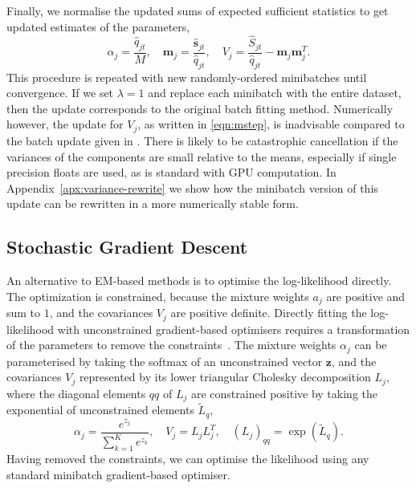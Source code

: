 \documentclass{article}
\newcommand{\bm}{\mathbf{m}}
\newcommand{\bs}{\mathbf{s}}
\begin{document}
Finally, we normalise the updated sums of expected sufficient statistics to get updated estimates of the parameters,
\begin{equation}
\alpha_{j} = \frac{\hat{q}_{jt}}{M}, \quad
\bm_{j} = \frac{\hat{\bs}_{jt}}{\hat{q}_{jt}}, \quad
V_{j} = \frac{\hat{S}_{jt}}{\hat{q}_{jt}} - \bm_{j} \bm_{j}^T.
\label{eqn:mstep}
\end{equation}
This procedure is repeated with new randomly-ordered minibatches until convergence.
If we set $\lambda=1$ and replace each minibatch with the entire dataset,
then the update corresponds to the original batch fitting method.
Numerically however, the update for $V_j$, as written in \eqref{eqn:mstep}, is inadvisable compared to the batch update given in \cite{bovyExtremeDeconvolutionInferring2011}. There is likely to be catastrophic cancellation if the variances of the components are small relative to the means, especially if single precision floats are used, as is standard with GPU computation.
In Appendix~\ref{apx:variance-rewrite} we show how the minibatch version of this update can be rewritten in a
more numerically stable form.


\subsection{Stochastic Gradient Descent}

An alternative to EM-based methods is to optimise the log-likelihood directly.
The optimization is constrained, because the mixture weights $a_j$ are positive and sum to $1$, and the covariances $V_j$ are positive definite.
Directly fitting the log-likelihood with unconstrained gradient-based optimisers requires a transformation of the parameters to remove the constraints~\cite{williams1996}.
The mixture weights $\alpha_j$ can be parameterised by taking the softmax of an unconstrained vector $\mathbf{z}$, and the covariances $V_j$ represented by its lower triangular Cholesky decomposition $L_j$, where the diagonal elements $qq$ of $L_j$ are constrained positive by taking the exponential of unconstrained elements $\tilde{L}_q$,
\begin{equation}
\alpha_j = \frac{e^{z_j}}{\sum_{k=1}^K e^{z_k}}, \quad
V_j = L_jL_j^T, \quad
(L_j)_{qq} = \exp({\tilde{L}_q}).
\end{equation}
Having removed the constraints, we can optimise the likelihood using any standard minibatch gradient-based optimiser.
\end{document}
